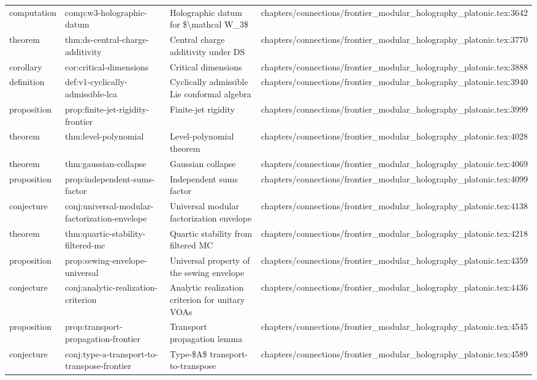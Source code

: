 \documentclass[11pt]{article}
\begin{document}
\begin{longtable}{L{0.10\textwidth}L{0.26\textwidth}L{0.42\textwidth}L{0.22\textwidth}}
computation & comp:w3-holographic-datum & Holographic datum for \$\textbackslash{}mathcal W\_3\$ & chapters/connections/frontier\_modular\_holography\_platonic.tex:3642\\
theorem & thm:ds-central-charge-additivity & Central charge additivity under DS & chapters/connections/frontier\_modular\_holography\_platonic.tex:3770\\
corollary & cor:critical-dimensions & Critical dimensions & chapters/connections/frontier\_modular\_holography\_platonic.tex:3888\\
definition & def:v1-cyclically-admissible-lca & Cyclically admissible Lie conformal algebra & chapters/connections/frontier\_modular\_holography\_platonic.tex:3940\\
proposition & prop:finite-jet-rigidity-frontier & Finite-jet rigidity & chapters/connections/frontier\_modular\_holography\_platonic.tex:3999\\
theorem & thm:level-polynomial & Level-polynomial theorem & chapters/connections/frontier\_modular\_holography\_platonic.tex:4028\\
theorem & thm:gaussian-collapse & Gaussian collapse & chapters/connections/frontier\_modular\_holography\_platonic.tex:4069\\
proposition & prop:independent-sums-factor & Independent sums factor & chapters/connections/frontier\_modular\_holography\_platonic.tex:4099\\
conjecture & conj:universal-modular-factorization-envelope & Universal modular factorization envelope & chapters/connections/frontier\_modular\_holography\_platonic.tex:4138\\
theorem & thm:quartic-stability-filtered-mc & Quartic stability from filtered MC & chapters/connections/frontier\_modular\_holography\_platonic.tex:4218\\
proposition & prop:sewing-envelope-universal & Universal property of the sewing envelope & chapters/connections/frontier\_modular\_holography\_platonic.tex:4359\\
conjecture & conj:analytic-realization-criterion & Analytic realization criterion for unitary VOAs & chapters/connections/frontier\_modular\_holography\_platonic.tex:4436\\
proposition & prop:transport-propagation-frontier & Transport propagation lemma & chapters/connections/frontier\_modular\_holography\_platonic.tex:4545\\
conjecture & conj:type-a-transport-to-transpose-frontier & Type-\$A\$ transport-to-transpose & chapters/connections/frontier\_modular\_holography\_platonic.tex:4589\\

\end{longtable}
\end{document}
